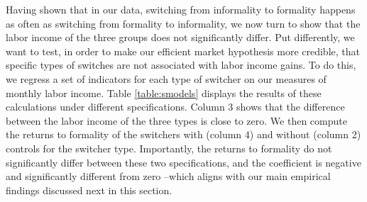 \documentclass{svjour3}                     %
\begin{document}
\indent Having shown that in our data, switching from informality to formality happens as often as switching from formality to informality, we now turn to show that the labor income of the three groups does not significantly differ. Put differently, we want to test, in order to make our efficient market hypothesis more credible, that specific types of switches are not associated with labor income gains. To do this, we regress a set of indicators for each type of switcher on our measures of monthly labor income. Table \ref{table:smodels} displays the results of these calculations under different specifications. Column 3 shows that the difference between the labor income of the three types is close to zero. We then compute the returns to formality of the switchers with (column 4) and without (column 2) controls for the switcher type. Importantly, the returns to formality do not significantly differ between these two specifications, and the coefficient is negative and significantly different from zero --which aligns with our main empirical findings discussed next in this section.
\end{document}

